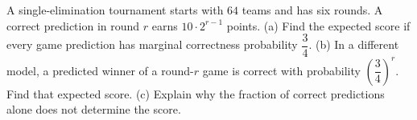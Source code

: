 A single-elimination tournament starts with $64$ teams and has six rounds. A correct prediction in round $r$ earns $10\cdot2^{r-1}$ points. (a) Find the expected score if every game prediction has marginal correctness probability $\dfrac{3}{4}$. (b) In a different model, a predicted winner of a round-$r$ game is correct with probability $(\dfrac{3}{4})^r$. Find that expected score. (c) Explain why the fraction of correct predictions alone does not determine the score.
